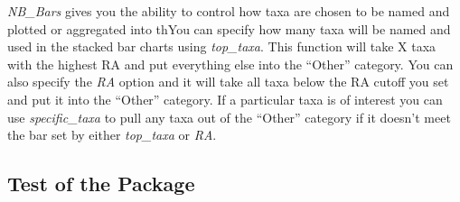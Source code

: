\documentclass[]{article}
\newenvironment{Shaded}{\begin{snugshade}}{\end{snugshade}}
\newcommand{\KeywordTok}[1]{\textcolor[rgb]{0.13,0.29,0.53}{\textbf{#1}}}
\newcommand{\DataTypeTok}[1]{\textcolor[rgb]{0.13,0.29,0.53}{#1}}
\newcommand{\DecValTok}[1]{\textcolor[rgb]{0.00,0.00,0.81}{#1}}
\newcommand{\StringTok}[1]{\textcolor[rgb]{0.31,0.60,0.02}{#1}}
\newcommand{\OtherTok}[1]{\textcolor[rgb]{0.56,0.35,0.01}{#1}}
\newcommand{\OperatorTok}[1]{\textcolor[rgb]{0.81,0.36,0.00}{\textbf{#1}}}
\newcommand{\NormalTok}[1]{#1}
\begin{document}
\emph{NB\_Bars} gives you the ability to control how taxa are chosen to
be named and plotted or aggregated into thYou can specify how many taxa
will be named and used in the stacked bar charts using \emph{top\_taxa}.
This function will take X taxa with the highest RA and put everything
else into the ``Other'' category. You can also specify the \emph{RA}
option and it will take all taxa below the RA cutoff you set and put it
into the ``Other'' category. If a particular taxa is of interest you can
use \emph{specific\_taxa} to pull any taxa out of the ``Other'' category
if it doesn't meet the bar set by either \emph{top\_taxa} or \emph{RA}.

\begin{Shaded}
\end{Shaded}

\subsection{Test of the Package}\label{test-of-the-package}
\end{document}
